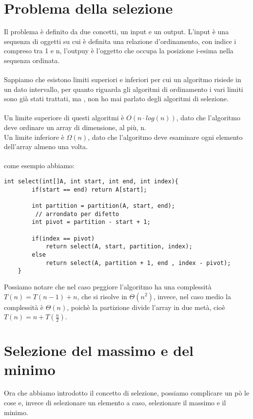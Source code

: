 \documentclass[a4paper,12pt]{article}
\begin{document}
\section{Problema della selezione}
Il problema è definito da due concetti, un input e un output. 
L'input è una sequenza di oggetti su cui è definita una relazione d'ordinamento, con indice i compreso tra 1 e n, 
l'outpuy è l'oggetto che occupa la posizione i-esima nella sequenza ordinata. \\
\\
Sappiamo che esistono limiti superiori e inferiori per cui un algoritmo risiede in un dato intervallo,
per quanto riguarda gli algoritmi di ordinamento i vari limiti sono già stati trattati, ma , non ho mai parlato degli algoritmi di selezione. \\
\\
Un limite superiore di questi algoritmi è $O(n \cdot log(n) )$, dato che l'algoritmo deve ordinare un array di dimensione, al più, n. \\
Un limite inferiore è $\Omega(n)$, dato che l'algoritmo deve esaminare ogni elemento dell'array almeno una volta. \\
\\
come esempio abbiamo:
\begin{lstlisting}[style=mystyle]
    int select(int[]A, int start, int end, int index){
        if(start == end) return A[start];

        int partition = partition(A, start, end);
         // arrondato per difetto
        int pivot = partition - start + 1;

        if(index == pivot)
            return select(A, start, partition, index);
        else
            return select(A, partition + 1, end , index - pivot);
    }
\end{lstlisting}
Possiamo notare che nel caso peggiore l'algoritmo ha una complessità $T(n) = T(n-1) + n$, che si risolve in $\Theta(n^2)$, invece, nel caso medio la complessità è $\Theta(n)$, poichè la partizione divide l'array in due metà, cioè $T(n) = n +T(\frac{n}{2})$. \\

\section{Selezione del massimo e del minimo}
Ora che abbiamo introdotto il concetto di selezione, possiamo complicare un pò le cose e, invece di selezionare un elemento a caso, selezionare il massimo e il minimo. \\
\\
\end{document}
